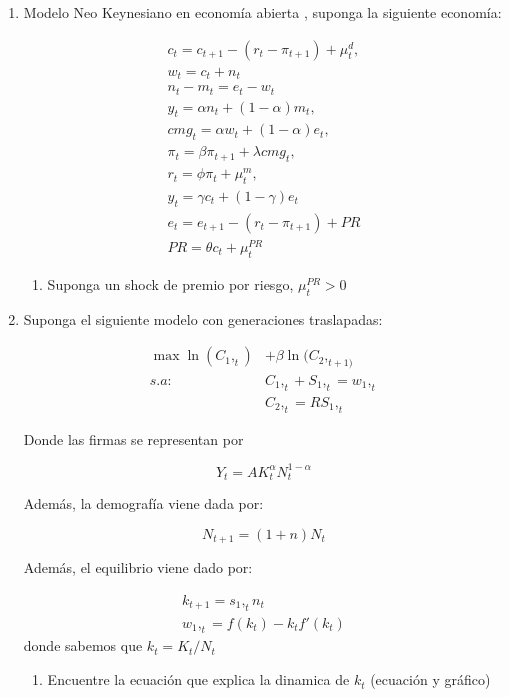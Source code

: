 \documentclass[a4paper,12pt]{article}
\begin{document}
\begin{enumerate}
    \item  Modelo Neo Keynesiano en economía abierta , suponga la siguiente economía:
    
\begin{gather}
c_t=c_{t+1} - (r_t- \pi_{t+1})+\mu_t^d,\\[10pt]
w_t= c_t+n_t\\[10pt]
n_t-m_t=e_t-w_t\\[10pt]
y_t=\alpha n_t+(1-\alpha)m_t,\\[10pt]
cmg_t=\alpha w_t+(1-\alpha)e_t,\\[10pt]
\pi_t=\beta \pi_{t+1}+\lambda cmg_t ,\\[10pt]
r_t=\phi \pi_t + \mu_t^m,\\[10pt]
y_t=\gamma c_t + (1-\gamma)e_t\\[10pt]
e_t=e_{t+1}-(r_t-\pi_{t+1})+PR\\[10pt]
PR=\theta c_t+\mu_t^{PR}
\end{gather}

\begin{enumerate}
    \item Suponga un shock de premio por riesgo, $\mu^{PR}_t>0$
\end{enumerate}

\item Suponga el siguiente modelo con generaciones traslapadas:

\begin{align*}
    \max \ln(C_1,_t)&+\beta \ln(C_2,_{t+1)}\\[10pt]
    s.a: &C_1,_t + S_1,_t=w_1,_t\\
    &C_2,_t=RS_1,_t
\end{align*}

Donde las firmas se representan por

\begin{equation*}
    Y_t=AK_t^\alpha N_t^{1-\alpha}
\end{equation*}

Además, la demografía viene dada por:

\begin{equation*}
    N_{t+1}=(1+n)N_t
\end{equation*}

Además, el equilibrio viene dado por:

\begin{gather*}
    k_{t+1}=s_1,_t n_t\\
    w_1,_t=f(k_t)-k_tf' (k_t)
\end{gather*}
donde sabemos  que $k_t=K_t/N_t$
\begin{enumerate}
    \item Encuentre la ecuación que explica la dinamica de $k_t$ (ecuación y gráfico)
\end{enumerate}
    
\end{enumerate}
\end{document}
